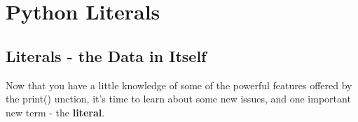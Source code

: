 \documentclass[a4paper,10pt]{article}
\begin{document}
\section{Python Literals}
\subsection{Literals - the Data in Itself}
Now that you have a little knowledge of some of the powerful features offered by the {\selectfont print()} unction, it's time to learn about some new issues, and one important new term - the \textbf{literal}.
\end{document}
